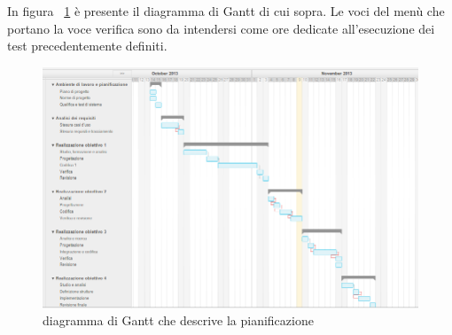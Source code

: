 In figura ~\ref{fig:pianificazione} è presente il diagramma di Gantt di cui sopra. Le voci del menù che portano la voce verifica sono da intendersi come ore dedicate all'esecuzione dei test precedentemente definiti.
\begin{figure}[!t]
\centering
\includegraphics[width=1.0\textwidth]{./images/pianificazione.png}
\caption{diagramma di Gantt che descrive la pianificazione}
\label{fig:pianificazione}
\end{figure}






